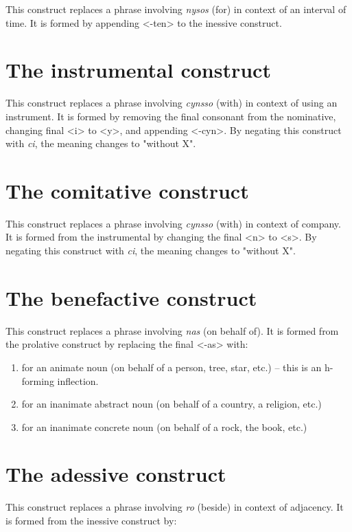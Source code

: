 \documentclass{book}
\begin{document}
This construct replaces a phrase involving \emph{nysos} (for) in context of an interval of time. It is formed by appending <-ten> to the inessive construct.

\section{The instrumental construct}

This construct replaces a phrase involving \emph{cynsso} (with) in context of using an instrument. It is formed by removing the final consonant from the nominative, changing final <i> to <y>, and appending <-cyn>. By negating this construct with \emph{ci}, the meaning changes to "without X".

\section{The comitative construct}

This construct replaces a phrase involving \emph{cynsso} (with) in context of company. It is formed from the instrumental by changing the final <n> to <s>. By negating this construct with \emph{ci}, the meaning changes to "without X".

\section{The benefactive construct}

This construct replaces a phrase involving \emph{nas} (on behalf of). It is formed from the prolative construct by replacing the final <-as> with:

\begin{enumerate}
  \item <-en> for an animate noun (on behalf of a person, tree, star, etc.) -- this is an h-forming inflection.
  \item <-as> for an inanimate abstract noun (on behalf of a country, a religion, etc.)
  \item <-an> for an inanimate concrete noun (on behalf of a rock, the book, etc.)
\end{enumerate}

\section{The adessive construct}

This construct replaces a phrase involving \emph{ro} (beside) in context of adjacency. It is formed from the inessive construct by:
\end{document}
